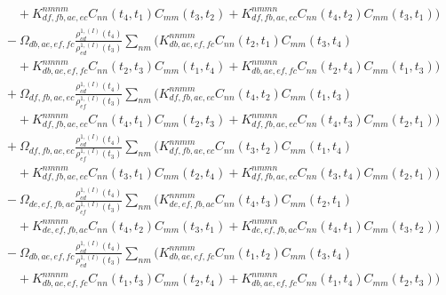 {{{\begin{equation*}
\begin{aligned}
&\quad \quad \quad \quad  + K_{df,fb,ae,ec}^{nmnm} C_{nn}(t_4, t_1)C_{mm}(t_3, t_2) + K_{df,fb,ae,ec}^{nmmn} C_{nn}(t_4, t_2)C_{mm}(t_3, t_1) \big) \\ %
&\quad \quad \quad - \Omega_{db,ae,ef,fc} \frac{\rho_{ c d }^{1, (I) }(t_4)}{ \rho_{ e d }^{1, (I) }(t_3)} \sum_{nm} \big(K_{db,ae,ef,fc}^{nnmm} C_{nn}(t_2, t_1)C_{mm} (t_3, t_4) \\
&\quad \quad \quad \quad  + K_{db,ae,ef,fc}^{nmnm} C_{nn}(t_2, t_3)C_{mm}(t_1, t_4) + K_{db,ae,ef,fc}^{nmmn} C_{nn}(t_2, t_4)C_{mm}(t_1, t_3) \big)\\ %
&\quad \quad \quad + \Omega_{df,fb,ae,ec} \frac{\rho_{ c d }^{1, (I) }(t_4)}{ \rho_{ e f }^{1, (I) }(t_3)} \sum_{nm} \big(K_{df,fb,ae,ec}^{nnmm} C_{nn}(t_4, t_2)C_{mm} (t_1, t_3) \\
&\quad \quad \quad \quad  + K_{df,fb,ae,ec}^{nmnm} C_{nn}(t_4, t_1)C_{mm}(t_2, t_3) + K_{df,fb,ae,ec}^{nmmn} C_{nn}(t_4, t_3)C_{mm}(t_2, t_1) \big) \\ %
&\quad \quad \quad + \Omega_{df,fb,ae,ec} \frac{\rho_{ c d }^{1, (I) }(t_4)}{ \rho_{ e f }^{1, (I) }(t_3)} \sum_{nm} \big(K_{df,fb,ae,ec}^{nnmm} C_{nn}(t_3, t_2)C_{mm} (t_1, t_4) \\
&\quad \quad \quad \quad  + K_{df,fb,ae,ec}^{nmnm} C_{nn}(t_3, t_1)C_{mm}(t_2, t_4) + K_{df,fb,ae,ec}^{nmmn} C_{nn}(t_3, t_4)C_{mm}(t_2, t_1) \big) \\ %
&\quad \quad \quad - \Omega_{de,ef,fb,ac} \frac{\rho_{ c d }^{1, (I) }(t_4)}{ \rho_{ c f }^{1, (I) }(t_3)} \sum_{nm} \big(K_{de,ef,fb,ac}^{nnmm} C_{nn}(t_4, t_3)C_{mm} (t_2, t_1) \\
&\quad \quad \quad \quad  + K_{de,ef,fb,ac}^{nmnm} C_{nn}(t_4, t_2)C_{mm}(t_3, t_1) + K_{de,ef,fb,ac}^{nmmn} C_{nn}(t_4, t_1)C_{mm}(t_3, t_2) \big) \\ %
    &\quad \quad \quad - \Omega_{db,ae,ef,fc} \frac{\rho_{ c d }^{1, (I) }(t_4)}{ \rho_{ e d }^{1, (I) }(t_3)} \sum_{nm} \big(K_{db,ae,ef,fc}^{nnmm} C_{nn}(t_1, t_2)C_{mm} (t_3, t_4)  \\
&\quad \quad \quad \quad + K_{db,ae,ef,fc}^{nmnm} C_{nn}(t_1, t_3)C_{mm}(t_2, t_4) + K_{db,ae,ef,fc}^{nmmn} C_{nn}(t_1, t_4)C_{mm}(t_2, t_3) \big)  \\ %

    \end{aligned}
\end{equation*}
}}
}


